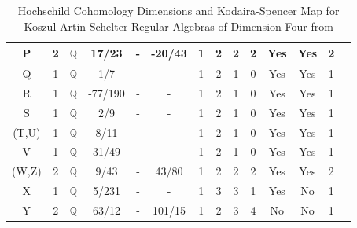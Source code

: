 \documentclass{amsart}
\begin{document}
\begin{table}[H]
\begin{tabular}{|c|c|c|c|c|c|c|c|c|c|c|c|c|c|}
        \hline
        P & 2 & $\mathbb{Q}$&17/23 &- & -20/43 &1 & 2 & 2 & 2 & Yes & Yes & 2\\
        \hline
        Q & 1 & $\mathbb{Q}$ &1/7 &- &-  & 1 & 2 & 1 & 0 & Yes & Yes & 1\\
        \hline
        R & 1 & $\mathbb{Q}$&-77/190 &- & - & 1 & 2 & 1 & 0 & Yes & Yes & 1\\
        \hline
        S & 1 & $\mathbb{Q}$  &2/9 &- &- & 1 & 2 & 1 & 0 & Yes & Yes & 1\\
        \hline
        (T,U) & 1& $\mathbb{Q}$&8/11 &- & - & 1 & 2 & 1 & 0 & Yes & Yes & 1\\
        \hline
        V & 1  &$\mathbb{Q}$ & 31/49&- &- & 1 & 2 & 1 & 0 & Yes & Yes & 1\\
        \hline
        (W,Z) & 2 & $\mathbb{Q}$& 9/43&- & 43/80 & 1 & 2 & 2 & 2& Yes & Yes & 2\\
        \hline
        X & 1& $\mathbb{Q}$& 5/231&- & - & 1 & 3 & 3 & 1& Yes & No & 1 \\
        \hline
        Y & 2 & $\mathbb{Q}$ & 63/12&- &101/15 & 1 & 2 & 3 & 4 & No & No & 1\\
        \hline
        \end{tabular}
    \caption{Hochschild Cohomology Dimensions and Kodaira-Spencer Map for Koszul Artin-Schelter Regular Algebras of Dimension Four from \cite{MR2529094}}
    \label{tab:HH_dimensions_KS_map_3}
\end{table}
\end{document}
